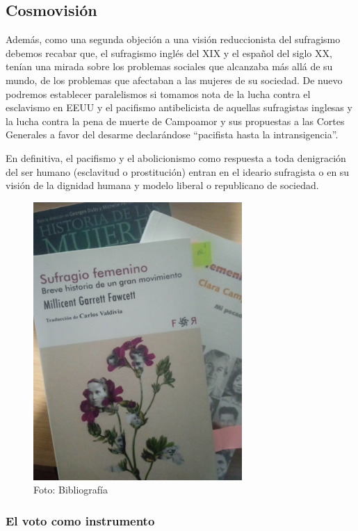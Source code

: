 \documentclass[
]{article}
\begin{document}
\hypertarget{cosmovisiuxf3n}{%
\subsection{Cosmovisión}\label{cosmovisiuxf3n}}

Además, como una segunda objeción a una visión reduccionista del
sufragismo debemos recabar que, el sufragismo inglés del XIX y el
español del siglo XX, tenían una mirada sobre los problemas sociales que
alcanzaba más allá de su mundo, de los problemas que afectaban a las
mujeres de su sociedad. De nuevo podremos establecer paralelismos si
tomamos nota de la lucha contra el esclavismo en EEUU y el pacifismo
antibelicista de aquellas sufragistas inglesas y la lucha contra la pena
de muerte de Campoamor y sus propuestas a las Cortes Generales a favor
del desarme declarándose ``pacifista hasta la intransigencia''.

En definitiva, el pacifismo y el abolicionismo como respuesta a toda
denigración del ser humano (esclavitud o prostitución) entran en el
ideario sufragista o en su visión de la dignidad humana y modelo liberal
o republicano de sociedad.

\begin{figure}
\centering
\includegraphics[width=3.125in,height=\textheight]{png/Fuentes.jpg}
\caption{Foto: Bibliografía}
\end{figure}

\hypertarget{el-voto-como-instrumento}{%
\subsubsection{El voto como
instrumento}\label{el-voto-como-instrumento}}
\end{document}
